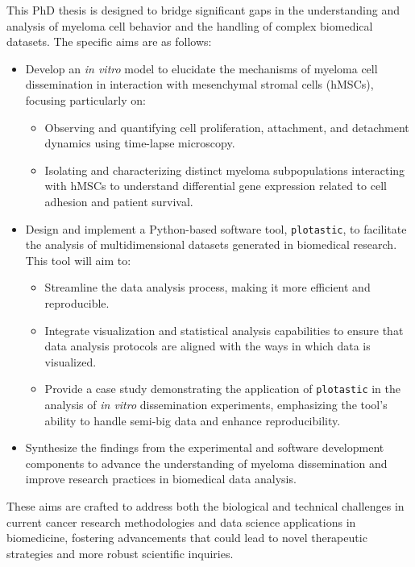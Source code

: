 

\label{sec:aims}%
This PhD thesis is designed to bridge significant gaps in the understanding and
analysis of myeloma cell behavior and the handling of complex biomedical
datasets. The specific aims are as follows:

\begin{itemize}
    \item Develop an \textit{in vitro} model to elucidate the mechanisms of
          myeloma cell dissemination in interaction with mesenchymal stromal cells
          (hMSCs), focusing particularly on:
          \begin{itemize}
              \item Observing and quantifying cell proliferation, attachment, and
                    detachment dynamics using time-lapse microscopy.
              \item Isolating and characterizing distinct myeloma subpopulations
                    interacting with hMSCs to understand differential gene expression
                    related to cell adhesion and patient survival.
          \end{itemize}

    \item Design and implement a Python-based software tool, \texttt{plotastic},
          to facilitate the analysis of multidimensional datasets
          generated in biomedical research. This tool will aim to:
          \begin{itemize}
              \item Streamline the data analysis process, making it more efficient and
                    reproducible.
              \item Integrate visualization and statistical analysis capabilities to
                    ensure that data analysis protocols are aligned with the ways in which
                    data is visualized.
              \item Provide a case study demonstrating the application of
                    \texttt{plotastic} in the analysis of \textit{in vitro} dissemination
                    experiments, emphasizing the tool's ability to handle semi-big data and
                    enhance reproducibility.
          \end{itemize}

    \item Synthesize the findings from the experimental and software development
          components to advance the understanding of myeloma dissemination and improve
          research practices in biomedical data analysis.
\end{itemize}

These aims are crafted to address both the biological and technical challenges
in current cancer research methodologies and data science applications in
biomedicine, fostering advancements that could lead to novel therapeutic
strategies and more robust scientific inquiries.